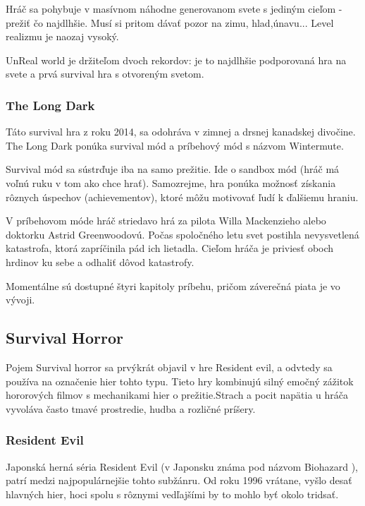 \documentclass[10pt,oneoside,slovak,a4paper]{article}
\begin{document}
Hráč sa pohybuje v masívnom náhodne generovanom svete s jediným cieľom - prežiť čo najdlhšie. Musí si pritom dávať pozor na zimu, hlad,únavu... Level realizmu je naozaj vysoký.

UnReal world je držiteľom dvoch rekordov: je to najdlhšie podporovaná hra na svete a prvá survival hra s otvoreným svetom. \cite{UnRealWorld}

\subsubsection{The Long Dark}

Táto survival hra z roku 2014, sa odohráva v zimnej a drsnej kanadskej divočine. The Long Dark ponúka survival mód a príbehový mód s názvom Wintermute.

Survival mód sa  sústrďuje iba na samo prežitie. Ide o sandbox  mód (hráč má voľnú ruku v tom ako chce hrať).  Samozrejme, hra ponúka  možnosť získania rôznych úspechov (achievementov), ktoré môžu motivovať ľudí k ďalšiemu hraniu. \cite{Virtanen}

V príbehovom móde hráč striedavo hrá za pilota Willa Mackenzieho  alebo doktorku  Astrid Greenwoodovú. Počas spoločného letu svet postihla nevysvetlená katastrofa, ktorá zapríčinila pád ich lietadla. Cieľom hráča je priviesť oboch hrdinov ku sebe a odhaliť dôvod katastrofy. \cite{Virtanen}

Momentálne sú dostupné štyri kapitoly príbehu, pričom záverečná piata je vo vývoji.


\subsection{Survival Horror}
Pojem Survival horror sa prvýkrát objavil v hre Resident evil, a odvtedy sa používa na označenie hier tohto typu. \cite{Kirkland} Tieto hry kombinujú silný emočný zážitok hororových filmov s mechanikami hier o prežitie.Strach a pocit napätia u hráča vyvoláva často  tmavé prostredie, hudba a rozličné príšery.

\subsubsection{Resident Evil}
Japonská herná séria Resident Evil (v Japonsku známa pod názvom Biohazard \cite{Capcom}), patrí medzi najpopulárnejšie tohto subžánru. Od roku 1996 vrátane, vyšlo desať hlavných hier, hoci spolu s rôznymi vedľajšími by to mohlo byť okolo tridsať.  \cite{ResEv}
\end{document}
